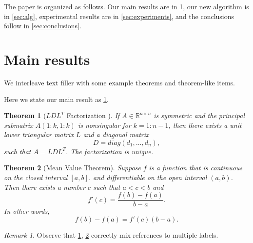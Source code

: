 \documentclass[10pt,reqno,final]{article}
\numberwithin{equation}{section}
\numberwithin{figure}{section}
\numberwithin{table}{section}
\theoremstyle{plain}
\newtheorem{theorem}{Theorem}[section]
\theoremstyle{definition}
\theoremstyle{remark}
\newtheorem{remark}{Remark}[section]
\begin{document}
The paper is organized as follows. Our main results are in
\ref{sec:main}, our new algorithm is in \ref{sec:alg}, experimental
results are in \ref{sec:experiments}, and the conclusions follow in
\ref{sec:conclusions}.

\section{Main results}
\label{sec:main}

We interleave text filler with some example theorems and theorem-like
items.

\lipsum[5]

Here we state our main result as \ref{thm:bigthm}.

\begin{theorem}[$LDL^T$ Factorization \cite{GoVa13}]\label{thm:bigthm}
  If $A \in \mathbb{R}^{n \times n}$ is symmetric and the principal
  submatrix $A(1:k,1:k)$ is nonsingular for $k=1:n-1$, then there
  exists a unit lower triangular matrix $L$ and a diagonal matrix
  \begin{displaymath}
    D = diag(d_1,\dots,d_n),  %
  \end{displaymath}
  such that $A=LDL^T$. The factorization is unique.
\end{theorem}

\lipsum[7]

\begin{theorem}[Mean Value Theorem]\label{thm:mvt}
  Suppose $f$ is a function that is continuous on the closed interval
  $[a,b]$.  and differentiable on the open interval $(a,b)$.
  Then there exists a number $c$ such that $a < c < b$ and
  \begin{displaymath}
    f'(c) = \frac{f(b)-f(a)}{b-a}.
  \end{displaymath}
  In other words,
  \begin{displaymath}
    f(b)-f(a) = f'(c)(b-a).
  \end{displaymath}
\end{theorem}

\begin{remark}
Observe that \ref{thm:bigthm}, \ref{thm:mvt} correctly mix references
to multiple labels.
\end{remark}


\end{document}
